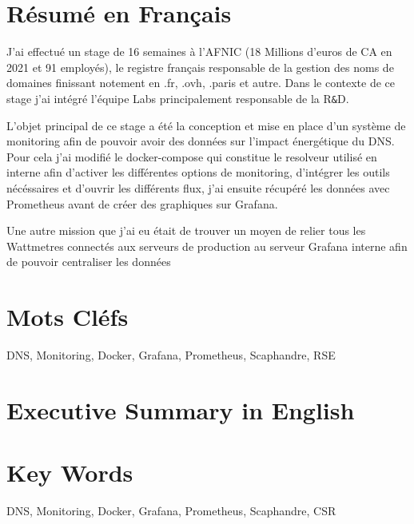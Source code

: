 \section{Résumé en Français}
J'ai effectué un stage de 16 semaines à l'AFNIC (18 Millions d'euros de CA en 2021 et 91 employés), le registre français responsable de la gestion des noms de domaines finissant notement en .fr, .ovh, .paris et autre.
Dans le contexte de ce stage j'ai intégré l'équipe Labs principalement responsable de la R\verb|&|D.

L'objet principal de ce stage a été la conception et mise en place d'un système de monitoring afin de pouvoir avoir des données sur l'impact énergétique du DNS.
Pour cela j'ai modifié le docker-compose qui constitue le resolveur utilisé en interne afin d'activer les différentes options de monitoring, d'intégrer les outils nécéssaires et d'ouvrir les différents flux, j'ai ensuite récupéré les données avec Prometheus avant de créer des graphiques sur Grafana.

Une autre mission que j'ai eu était de trouver un moyen de relier tous les Wattmetres connectés aux serveurs de production au serveur Grafana interne afin de pouvoir centraliser les données 

\section{Mots Cléfs}
DNS, Monitoring, Docker, Grafana, Prometheus, Scaphandre, RSE
\section{Executive Summary in English}
\section{Key Words}
DNS, Monitoring, Docker, Grafana, Prometheus, Scaphandre, CSR
